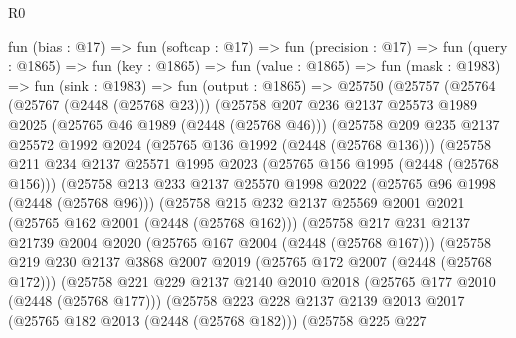 \begin{lexlean}{R0}
\begin{coremodule}
    fun (bias : @17) =>
    fun (softcap : @17) =>
    fun (precision : @17) =>
    fun (query : @1865) =>
    fun (key : @1865) =>
    fun (value : @1865) =>
    fun (mask : @1983) =>
    fun (sink : @1983) =>
    fun (output : @1865) =>
    @25750
      (@25757
        (@25764
          (@25767 (@2448 (@25768 @23)))
          (@25758
            @207
            @236
            @2137
            @25573
            @1989
            @2025
            (@25765 @46 @1989 (@2448 (@25768 @46)))
            (@25758
              @209
              @235
              @2137
              @25572
              @1992
              @2024
              (@25765 @136 @1992 (@2448 (@25768 @136)))
              (@25758
                @211
                @234
                @2137
                @25571
                @1995
                @2023
                (@25765 @156 @1995 (@2448 (@25768 @156)))
                (@25758
                  @213
                  @233
                  @2137
                  @25570
                  @1998
                  @2022
                  (@25765 @96 @1998 (@2448 (@25768 @96)))
                  (@25758
                    @215
                    @232
                    @2137
                    @25569
                    @2001
                    @2021
                    (@25765 @162 @2001 (@2448 (@25768 @162)))
                    (@25758
                      @217
                      @231
                      @2137
                      @21739
                      @2004
                      @2020
                      (@25765 @167 @2004 (@2448 (@25768 @167)))
                      (@25758
                        @219
                        @230
                        @2137
                        @3868
                        @2007
                        @2019
                        (@25765 @172 @2007 (@2448 (@25768 @172)))
                        (@25758
                          @221
                          @229
                          @2137
                          @2140
                          @2010
                          @2018
                          (@25765 @177 @2010 (@2448 (@25768 @177)))
                          (@25758
                            @223
                            @228
                            @2137
                            @2139
                            @2013
                            @2017
                            (@25765 @182 @2013 (@2448 (@25768 @182)))
                            (@25758
                              @225
                              @227

\end{coremodule}
\end{lexlean}

